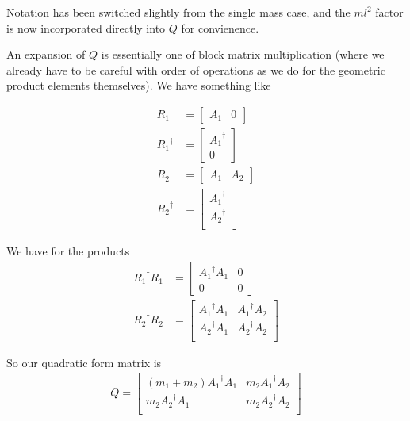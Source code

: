 Notation has been switched slightly from the single mass case, and the $m l^2$ factor is now incorporated directly into $Q$ for convienence.

An expansion of $Q$ is essentially one of block matrix multiplication (where we already have to be careful with order of operations as we do for the geometric product elements themselves).  We have something like

\begin{align}\label{eqn:sPolarMultiPendulum:zoo13}
R_1 &= 
\begin{bmatrix}
A_1 & 0
\end{bmatrix} \\
{R_1}^\dagger &= 
\begin{bmatrix}
{A_1}^\dagger \\
0
\end{bmatrix} \\
R_2 &= 
\begin{bmatrix}
A_1 & A_2
\end{bmatrix} \\
{R_2}^\dagger &= 
\begin{bmatrix}
{A_1}^\dagger \\
{A_2}^\dagger \\
\end{bmatrix} 
\end{align}

We have for the products
\begin{align}\label{eqn:sPolarMultiPendulum:zoo14}
{R_1}^\dagger R_1 &=
\begin{bmatrix}
{A_1}^\dagger A_1 & 0 \\
0 & 0
\end{bmatrix} \\
{R_2}^\dagger R_2 &=
\begin{bmatrix}
{A_1}^\dagger A_1 & {A_1}^\dagger A_2 \\
{A_2}^\dagger A_1 & {A_2}^\dagger A_2 \\
\end{bmatrix} 
\end{align}

So our quadratic form matrix is
\begin{align}\label{eqn:sPolarMultiPendulum:zoo15}
Q =
\begin{bmatrix}
(m_1 + m_2) {A_1}^\dagger A_1 & m_2 {A_1}^\dagger A_2 \\
m_2 {A_2}^\dagger A_1 & m_2 {A_2}^\dagger A_2 \\
\end{bmatrix} 
\end{align}

